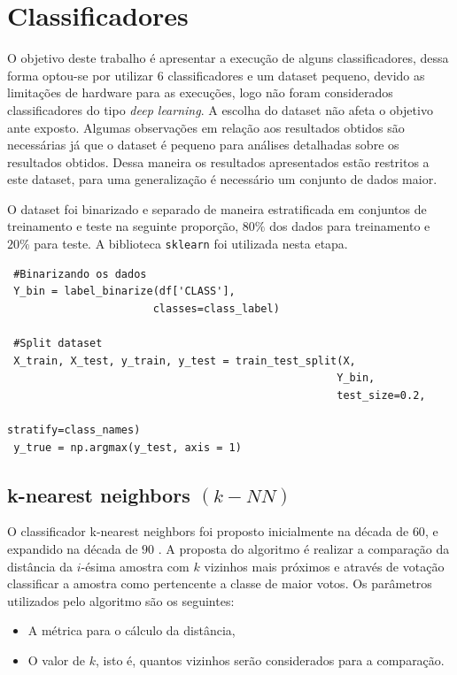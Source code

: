 \documentclass[
	article,			%
	11pt,				%
	oneside,			%
	a4paper,			%
	english,			%
	brazil,				%
	sumario=tradicional
	]{abntex2}
\begin{document}
\newpage
\section{Classificadores}

O objetivo deste trabalho é apresentar a execução de alguns classificadores, dessa forma optou-se por utilizar $6$ classificadores e um dataset pequeno, devido as limitações de hardware para as execuções, logo não foram considerados classificadores do tipo \textit{ deep learning}. A escolha do dataset não afeta o objetivo ante exposto. Algumas observações em relação aos resultados obtidos são necessárias já que o dataset é pequeno para análises detalhadas sobre os resultados obtidos. Dessa maneira os resultados apresentados estão restritos a este dataset, para uma generalização é necessário um conjunto de dados maior.

O dataset foi binarizado e separado de maneira estratificada em conjuntos de treinamento e teste na seguinte proporção, $80\%$ dos dados para treinamento e $20\%$ para teste. A biblioteca \verb|sklearn| foi utilizada nesta etapa.

\begin{verbatim}
 #Binarizando os dados
 Y_bin = label_binarize(df['CLASS'], 
                       classes=class_label)
 
 #Split dataset
 X_train, X_test, y_train, y_test = train_test_split(X,
                                                    Y_bin, 
                                                    test_size=0.2,
                                                    stratify=class_names)
 y_true = np.argmax(y_test, axis = 1)
\end{verbatim}


\subsection{k-nearest neighbors $(k-NN)$}

O classificador k-nearest neighbors foi proposto inicialmente na década de $60$, e expandido na década de $90$ \cite{KNN}. A proposta do algoritmo é realizar a comparação da distância da $i$-ésima amostra com $k$ vizinhos mais próximos e através de votação classificar a amostra como pertencente a classe de maior votos. Os parâmetros utilizados pelo algoritmo são os seguintes:
\begin{itemize}
 \item A métrica para o cálculo da distância,
 \item O valor de $k$, isto é, quantos vizinhos serão considerados para a comparação.
\end{itemize}
\end{document}
